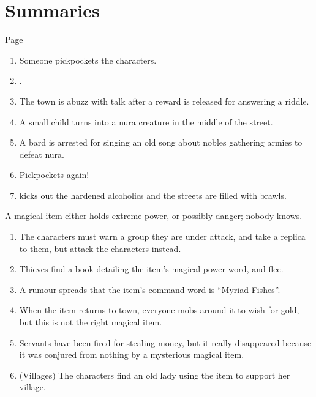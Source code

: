 \setcounter{encnum}{1}
\section{Summaries}


Page \pageref{randommeetings}

\begin{enumerate}

	\item{Someone pickpockets the characters.}
	\item{.}
	\item{The town is abuzz with talk after a reward is released for answering a riddle.}
	\item{ A small child turns into a nura creature in the middle of the street.}
	\item{A bard is arrested for singing an old song about nobles gathering armies to defeat nura.}
	\item{ Pickpockets again!}
	\item{ kicks out the hardened alcoholics and the streets are filled with brawls.}
\end{enumerate}

A magical item either holds extreme power, or possibly danger; nobody knows.

\begin{enumerate}

	\item{The characters must warn a group they are under attack, and take a replica to them, but attack the characters instead.}
	\item{Thieves find a book detailing the item's magical power-word, and flee.}
	\item{A rumour spreads that the item's command-word is ``Myriad Fishes''.}
	\item{When the item returns to town, everyone mobs around it to wish for gold, but this is not the right magical item.}
	\item{Servants have been fired for stealing money, but it really disappeared because it was conjured from nothing by a mysterious magical item.}
	\item{(Villages) The characters find an old lady using the item to support her village.}
\end{enumerate}

